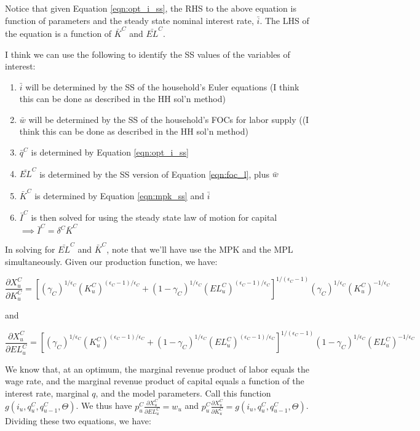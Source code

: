 Notice that given Equation \ref{eqn:opt_i_ss}, the RHS to the above equation is function of parameters and the steady state nominal interest rate, $\bar{i}$.  The LHS of the equation is a function of $\bar{K}^{C}$ and $\bar{EL}^{C}$.

I think we can use the following to identify the SS values of the variables of interest:
\begin{enumerate}
\item $\bar{i}$ will be determined by the SS of the household's Euler equations (I think this can be done as described in the HH sol'n method)
\item $\bar{w}$ will be determined by the SS of the household's FOCs for labor supply ((I think this can be done as described in the HH sol'n method)
\item $\bar{q}^{C}$ is determined by Equation \ref{eqn:opt_i_ss}
\item $\bar{EL}^{C}$ is determined by the SS version of Equation \ref{eqn:foc_l}, plus $\bar{w}$
\item $\bar{K}^{C}$ is determined by Equation \ref{eqn:mpk_ss} and $\bar{i}$
\item $\bar{I}^{C}$ is then solved for using the steady state law of motion for capital $\implies \bar{I}^{C}=\delta^{C}\bar{K}^{C}$
\end{enumerate}

In solving for $\bar{EL}^{C}$ and $\bar{K}^{C}$, note that we'll have use the MPK and the MPL simultaneously.  Given our production function, we have:

\begin{equation}
\label{eqn:mpk}
\frac{\partial X^{C}_{u}}{\partial K^{C}_{u}} = \left[(\gamma_{C})^{1/\epsilon_{C}}(K^{C}_{u})^{(\epsilon_{C}-1)/\epsilon_{C}}+(1-\gamma_{C})^{1/\epsilon_{C}}(EL^{C}_{u})^{(\epsilon_{C}-1)/\epsilon_{C}}\right]^{1/(\epsilon_{C}-1)}(\gamma_{C})^{1/\epsilon_{C}}(K^{C}_{u})^{-1/\epsilon_{C}}
\end{equation}

and 

\begin{equation}
\label{eqn:mpl}
\frac{\partial X^{C}_{u}}{\partial EL^{C}_{u}} = \left[(\gamma_{C})^{1/\epsilon_{C}}(K^{C}_{u})^{(\epsilon_{C}-1)/\epsilon_{C}}+(1-\gamma_{C})^{1/\epsilon_{C}}(EL^{C}_{u})^{(\epsilon_{C}-1)/\epsilon_{C}}\right]^{1/(\epsilon_{C}-1)}(1-\gamma_{C})^{1/\epsilon_{C}}(EL^{C}_{u})^{-1/\epsilon_{C}}
\end{equation}

We know that, at an optimum, the marginal revenue product of labor equals the wage rate, and the marginal revenue product of capital equals a function of the interest rate, marginal $q$, and the model parameters.  Call this function $g(i_{u},q^{C}_{u},q^{C}_{u-1},\Theta)$.  We thus have $p^{C}_{u}\frac{\partial X^{C}_{u}}{\partial EL^{C}_{u}} =w_{u}$ and $p^{C}_{u}\frac{\partial X^{C}_{u}}{\partial K^{C}_{u}}=g(i_{u},q^{C}_{u},q^{C}_{u-1},\Theta)$.  Dividing these two equations, we have:

